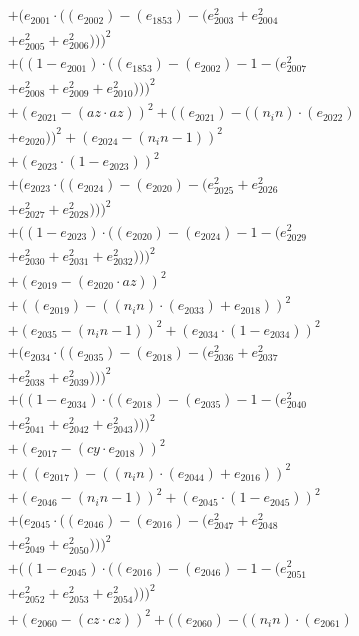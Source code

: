 \documentclass[10pt, a4paper]{article}
\begin{document}
\begin{align*}
& + (e_{2001}  \cdot  ((e_{2002}) - (e_{1853}) - (e_{2003}^{2} + e_{2004}^{2} \\
& + e_{2005}^{2} + e_{2006}^{2})))^{2} \\
& + ((1 - e_{2001})  \cdot  ((e_{1853}) - (e_{2002}) - 1 - (e_{2007}^{2} \\
& + e_{2008}^{2} + e_{2009}^{2} + e_{2010}^{2})))^{2} \\
& + (e_{2021} - (az  \cdot  az))^{2} + ((e_{2021}) - ((n_in)  \cdot  (e_{2022}) \\
& + e_{2020}))^{2} + (e_{2024} - (n_in - 1))^{2} \\
& + (e_{2023}  \cdot  (1 - e_{2023}))^{2} \\
& + (e_{2023}  \cdot  ((e_{2024}) - (e_{2020}) - (e_{2025}^{2} + e_{2026}^{2} \\
& + e_{2027}^{2} + e_{2028}^{2})))^{2} \\
& + ((1 - e_{2023})  \cdot  ((e_{2020}) - (e_{2024}) - 1 - (e_{2029}^{2} \\
& + e_{2030}^{2} + e_{2031}^{2} + e_{2032}^{2})))^{2} \\
& + (e_{2019} - (e_{2020}  \cdot  az))^{2} \\
& + ((e_{2019}) - ((n_in)  \cdot  (e_{2033}) + e_{2018}))^{2} \\
& + (e_{2035} - (n_in - 1))^{2} + (e_{2034}  \cdot  (1 - e_{2034}))^{2} \\
& + (e_{2034}  \cdot  ((e_{2035}) - (e_{2018}) - (e_{2036}^{2} + e_{2037}^{2} \\
& + e_{2038}^{2} + e_{2039}^{2})))^{2} \\
& + ((1 - e_{2034})  \cdot  ((e_{2018}) - (e_{2035}) - 1 - (e_{2040}^{2} \\
& + e_{2041}^{2} + e_{2042}^{2} + e_{2043}^{2})))^{2} \\
& + (e_{2017} - (cy  \cdot  e_{2018}))^{2} \\
& + ((e_{2017}) - ((n_in)  \cdot  (e_{2044}) + e_{2016}))^{2} \\
& + (e_{2046} - (n_in - 1))^{2} + (e_{2045}  \cdot  (1 - e_{2045}))^{2} \\
& + (e_{2045}  \cdot  ((e_{2046}) - (e_{2016}) - (e_{2047}^{2} + e_{2048}^{2} \\
& + e_{2049}^{2} + e_{2050}^{2})))^{2} \\
& + ((1 - e_{2045})  \cdot  ((e_{2016}) - (e_{2046}) - 1 - (e_{2051}^{2} \\
& + e_{2052}^{2} + e_{2053}^{2} + e_{2054}^{2})))^{2} \\
& + (e_{2060} - (cz  \cdot  cz))^{2} + ((e_{2060}) - ((n_in)  \cdot  (e_{2061}) \\

\end{align*}
\end{document}
